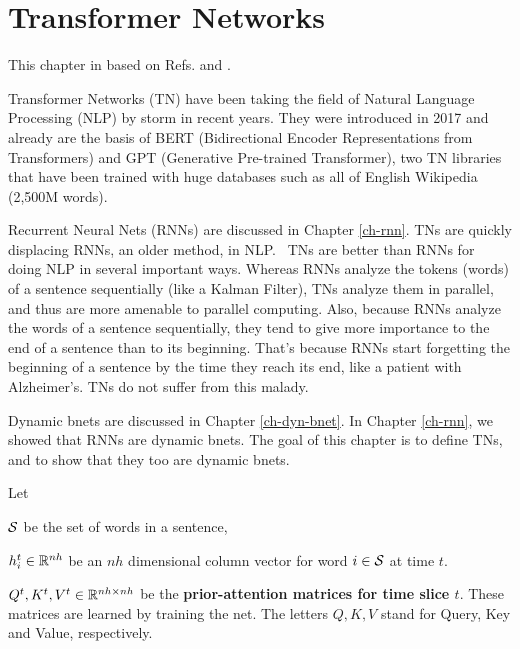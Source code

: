 \chapter{Transformer Networks}
\label{ch-transformer}

This chapter in based on Refs.\cite{joshi-trans}
and \cite{wiki-transformer}.

Transformer Networks (TN)
have been taking the field of
Natural Language Processing (NLP)
by storm in recent years.
They were introduced in 2017 and already
are the basis of
BERT (Bidirectional Encoder
Representations from Transformers)
and GPT (Generative Pre-trained Transformer),
two TN libraries that
have been trained with
huge databases such as all of
English Wikipedia (2,500M words).

Recurrent Neural Nets (RNNs)
are discussed in Chapter \ref{ch-rnn}.
TNs are quickly displacing RNNs, 
an older method, in NLP.  TNs are better than RNNs 
for doing NLP in several important ways. Whereas
 RNNs analyze the tokens (words) of a sentence 
sequentially (like a Kalman Filter), 
TNs analyze them in parallel, and thus are more
 amenable to parallel computing. Also, because
 RNNs analyze the words of a sentence sequentially, 
they tend to give more importance to the end 
of a sentence than to its beginning. That's because 
RNNs start forgetting the beginning of a sentence
 by the time they reach its end, like a patient 
with Alzheimer's. TNs do not suffer from this malady.

Dynamic bnets are discussed in Chapter \ref{ch-dyn-bnet}.
In Chapter \ref{ch-rnn},
we showed that RNNs
are dynamic bnets.
The goal of
this chapter
is to define TNs,
and to show that they too are
dynamic bnets.

Let

${\cal S}$ be the
set of words in a sentence,

$h^t_i\in { \mathbb{R}}^{nh}$ be
an $nh$ dimensional column vector
for word $i\in {\cal S}$ at time $t$.

$Q^t, K^t, V^t\in { \mathbb{R}}^{nh\times nh}$
be the  {\bf prior-attention matrices for time
slice $t$}.
These matrices are learned by training
the net.
The letters $Q,K,V$ stand for
 Query, Key and Value,
respectively.


